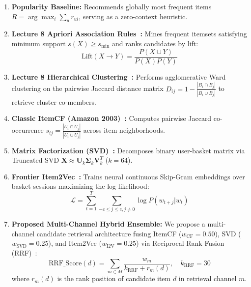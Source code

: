 \documentclass[sigconf,nonacm]{acmart}
\begin{document}
\begin{enumerate}
    \item \textbf{Popularity Baseline:} Recommends globally most frequent items $R = \arg\max_i \sum_u r_{ui}$, serving as a zero-context heuristic.
    \item \textbf{Lecture 8 Apriori Association Rules~\cite{agrawal1994fast}:} Mines frequent itemsets satisfying minimum support $s(X) \ge s_{\min}$ and ranks candidates by lift:
    \begin{equation}
    \text{Lift}(X \to Y) = \frac{P(X \cup Y)}{P(X) P(Y)}
    \end{equation}
    \item \textbf{Lecture 8 Hierarchical Clustering~\cite{ward1963hierarchical}:} Performs agglomerative Ward clustering on the pairwise Jaccard distance matrix $D_{ij} = 1 - \frac{|B_i \cap B_j|}{|B_i \cup B_j|}$ to retrieve cluster co-members.
    \item \textbf{Classic ItemCF (Amazon 2003)~\cite{linden2003amazon}:} Computes pairwise Jaccard co-occurrence $s_{ij} = \frac{|U_i \cap U_j|}{|U_i \cup U_j|}$ across item neighborhoods.
    \item \textbf{Matrix Factorization (SVD)~\cite{koren2009matrix}:} Decomposes binary user-basket matrix via Truncated SVD $\mathbf{X} \approx \mathbf{U}_k \mathbf{\Sigma}_k \mathbf{V}_k^T$ ($k=64$).
    \item \textbf{Frontier Item2Vec~\cite{barkan2016item2vec,mikolov2013distributed}:} Trains neural continuous Skip-Gram embeddings over basket sessions maximizing the log-likelihood:
    \begin{equation}
    \mathcal{L} = \sum_{t=1}^T \sum_{-c \le j \le c, j \neq 0} \log P(w_{t+j} | w_t)
    \end{equation}
    \item \textbf{Proposed Multi-Channel Hybrid Ensemble:} We propose a multi-channel candidate retrieval architecture fusing ItemCF ($w_{\text{CF}}=0.50$), SVD ($w_{\text{SVD}}=0.25$), and Item2Vec ($w_{\text{I2V}}=0.25$) via Reciprocal Rank Fusion (RRF)~\cite{cormack2009reciprocal}:
    \begin{equation}
    \text{RRF\_Score}(d) = \sum_{m \in M} \frac{w_m}{k_{\text{RRF}} + r_m(d)}, \quad k_{\text{RRF}} = 30
    \end{equation}
    where $r_m(d)$ is the rank position of candidate item $d$ in retrieval channel $m$.
\end{enumerate}
\end{document}
